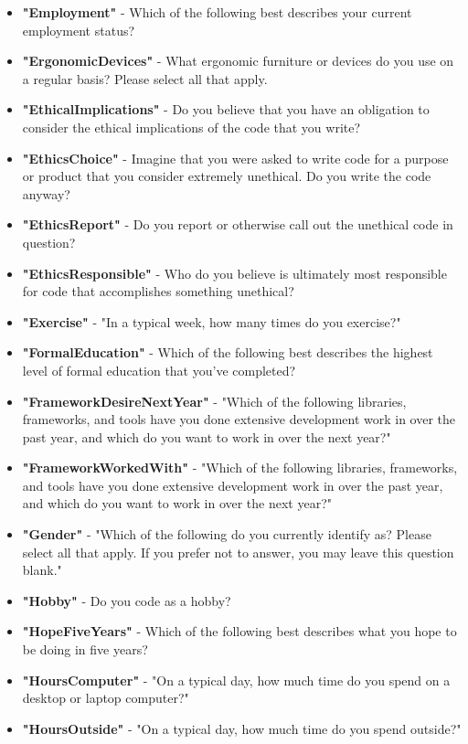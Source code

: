 \begin{appendices}
\begin{itemize}
        \item \textbf{"Employment"} - Which of the following best describes your current employment status?
        \item \textbf{"ErgonomicDevices"} - What ergonomic furniture or devices do you use on a regular basis? Please select all that apply.
        \item \textbf{"EthicalImplications"} - Do you believe that you have an obligation to consider the ethical implications of the code that you write?
        \item \textbf{"EthicsChoice"} - Imagine that you were asked to write code for a purpose or product that you consider extremely unethical. Do you write the code anyway?
        \item \textbf{"EthicsReport"} - Do you report or otherwise call out the unethical code in question?
        \item \textbf{"EthicsResponsible"} - Who do you believe is ultimately most responsible for code that accomplishes something unethical?
        \item \textbf{"Exercise"} - "In a typical week, how many times do you exercise?"
        \item \textbf{"FormalEducation"} - Which of the following best describes the highest level of formal education that you’ve completed?
        \item \textbf{"FrameworkDesireNextYear"} - "Which of the following libraries, frameworks, and tools have you done extensive development work in over the past year, and which do you want to work in over the next year?"
        \item \textbf{"FrameworkWorkedWith"} - "Which of the following libraries, frameworks, and tools have you done extensive development work in over the past year, and which do you want to work in over the next year?"
        \item \textbf{"Gender"} - "Which of the following do you currently identify as? Please select all that apply. If you prefer not to answer, you may leave this question blank."
        \item \textbf{"Hobby"} - Do you code as a hobby?
        \item \textbf{"HopeFiveYears"} - Which of the following best describes what you hope to be doing in five years?
        \item \textbf{"HoursComputer"} - "On a typical day, how much time do you spend on a desktop or laptop computer?"
        \item \textbf{"HoursOutside"} - "On a typical day, how much time do you spend outside?"

\end{itemize}
\end{appendices}
